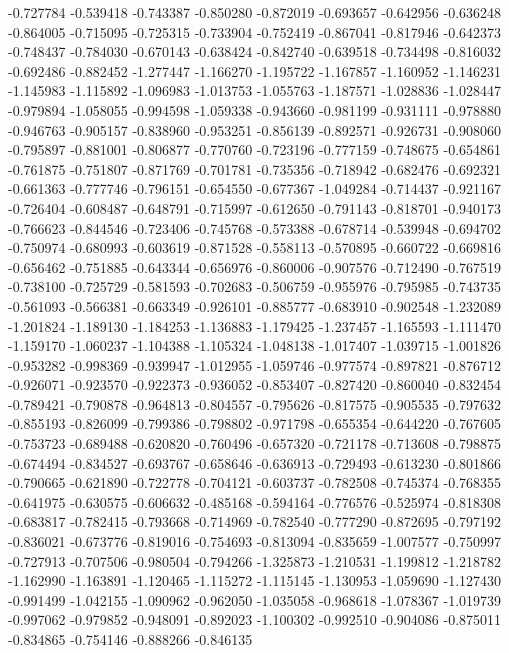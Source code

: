 -0.727784
-0.539418
-0.743387
-0.850280
-0.872019
-0.693657
-0.642956
-0.636248
-0.864005
-0.715095
-0.725315
-0.733904
-0.752419
-0.867041
-0.817946
-0.642373
-0.748437
-0.784030
-0.670143
-0.638424
-0.842740
-0.639518
-0.734498
-0.816032
-0.692486
-0.882452
-1.277447
-1.166270
-1.195722
-1.167857
-1.160952
-1.146231
-1.145983
-1.115892
-1.096983
-1.013753
-1.055763
-1.187571
-1.028836
-1.028447
-0.979894
-1.058055
-0.994598
-1.059338
-0.943660
-0.981199
-0.931111
-0.978880
-0.946763
-0.905157
-0.838960
-0.953251
-0.856139
-0.892571
-0.926731
-0.908060
-0.795897
-0.881001
-0.806877
-0.770760
-0.723196
-0.777159
-0.748675
-0.654861
-0.761875
-0.751807
-0.871769
-0.701781
-0.735356
-0.718942
-0.682476
-0.692321
-0.661363
-0.777746
-0.796151
-0.654550
-0.677367
-1.049284
-0.714437
-0.921167
-0.726404
-0.608487
-0.648791
-0.715997
-0.612650
-0.791143
-0.818701
-0.940173
-0.766623
-0.844546
-0.723406
-0.745768
-0.573388
-0.678714
-0.539948
-0.694702
-0.750974
-0.680993
-0.603619
-0.871528
-0.558113
-0.570895
-0.660722
-0.669816
-0.656462
-0.751885
-0.643344
-0.656976
-0.860006
-0.907576
-0.712490
-0.767519
-0.738100
-0.725729
-0.581593
-0.702683
-0.506759
-0.955976
-0.795985
-0.743735
-0.561093
-0.566381
-0.663349
-0.926101
-0.885777
-0.683910
-0.902548
-1.232089
-1.201824
-1.189130
-1.184253
-1.136883
-1.179425
-1.237457
-1.165593
-1.111470
-1.159170
-1.060237
-1.104388
-1.105324
-1.048138
-1.017407
-1.039715
-1.001826
-0.953282
-0.998369
-0.939947
-1.012955
-1.059746
-0.977574
-0.897821
-0.876712
-0.926071
-0.923570
-0.922373
-0.936052
-0.853407
-0.827420
-0.860040
-0.832454
-0.789421
-0.790878
-0.964813
-0.804557
-0.795626
-0.817575
-0.905535
-0.797632
-0.855193
-0.826099
-0.799386
-0.798802
-0.971798
-0.655354
-0.644220
-0.767605
-0.753723
-0.689488
-0.620820
-0.760496
-0.657320
-0.721178
-0.713608
-0.798875
-0.674494
-0.834527
-0.693767
-0.658646
-0.636913
-0.729493
-0.613230
-0.801866
-0.790665
-0.621890
-0.722778
-0.704121
-0.603737
-0.782508
-0.745374
-0.768355
-0.641975
-0.630575
-0.606632
-0.485168
-0.594164
-0.776576
-0.525974
-0.818308
-0.683817
-0.782415
-0.793668
-0.714969
-0.782540
-0.777290
-0.872695
-0.797192
-0.836021
-0.673776
-0.819016
-0.754693
-0.813094
-0.835659
-1.007577
-0.750997
-0.727913
-0.707506
-0.980504
-0.794266
-1.325873
-1.210531
-1.199812
-1.218782
-1.162990
-1.163891
-1.120465
-1.115272
-1.115145
-1.130953
-1.059690
-1.127430
-0.991499
-1.042155
-1.090962
-0.962050
-1.035058
-0.968618
-1.078367
-1.019739
-0.997062
-0.979852
-0.948091
-0.892023
-1.100302
-0.992510
-0.904086
-0.875011
-0.834865
-0.754146
-0.888266
-0.846135
